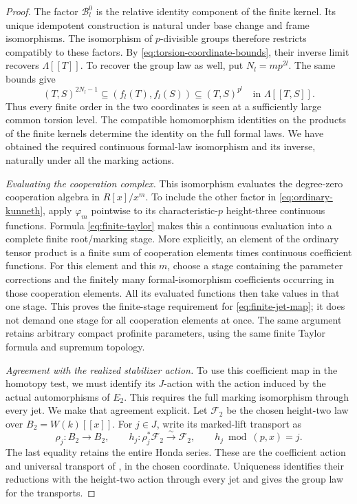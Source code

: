 \begin{proof}
The factor $\mathcal B_l^0$ is the relative identity component of
the finite kernel.  Its unique idempotent construction is natural
under base change and frame isomorphisms.  The isomorphism of
$p$-divisible groups therefore restricts compatibly to these
factors.  By \eqref{eq:torsion-coordinate-bounds}, their inverse
limit recovers $\Lambda[[T]]$. To recover the group law as well, put
$N_l=mp^{2l}$. The same bounds give
\[
 (T,S)^{2N_l-1}
   \subseteq(f_l(T),f_l(S))
   \subseteq(T,S)^{p^l}
       \quad\text{in }\Lambda[[T,S]].
\]
Thus every finite order in the two coordinates is seen at a sufficiently
large common torsion level. The compatible homomorphism identities on
the products of the finite kernels determine the identity on the full
formal laws. We have obtained the required continuous formal-law
isomorphism and its inverse, naturally under all the marking actions.

\smallskip\noindent\emph{Evaluating the cooperation complex.}
This isomorphism evaluates the degree-zero cooperation algebra in
$R[x]/x^m$.  To include the other factor in
\eqref{eq:ordinary-kunneth}, apply $\varphi_m$ pointwise to its
characteristic-$p$ height-three continuous functions.  Formula
\eqref{eq:finite-taylor} makes this a continuous evaluation into a
complete finite root/marking stage.  More explicitly, an element of
the ordinary tensor product is a finite sum of cooperation elements
times continuous coefficient functions.  For this element and this
$m$, choose a stage containing the parameter corrections and the
finitely many formal-isomorphism coefficients occurring in those
cooperation elements.  All its evaluated functions then take values
in that one stage.  This proves the finite-stage requirement for
\eqref{eq:finite-jet-map}; it does not demand one stage for all
cooperation elements at once.  The same argument retains arbitrary
compact profinite parameters, using the same finite Taylor formula
and supremum topology.

\smallskip\noindent\emph{Agreement with the realized stabilizer action.}
To use this coefficient map in the homotopy test, we must identify its
\(J\)-action with the action induced by the actual automorphisms of
\(E_2\). This requires the full marking isomorphism through every jet.
We make that agreement explicit. Let
\(\mathcal F_2\) be the chosen height-two law over
\(B_2=W(k)[[x]]\). For \(j\in J\), write its marked-lift transport as
\[
 \rho_j:B_2\longrightarrow B_2,\qquad
 h_j:\rho_j^*\mathcal F_2\xrightarrow{\sim}\mathcal F_2,\qquad
 h_j\bmod(p,x)=j.
\]
The last equality retains the entire Honda series. These are the
coefficient action and universal transport of
\citet[Section~1, Equation~(1.4), pp.~673--674]{DH95}, in the chosen
coordinate. Uniqueness identifies their reductions with the height-two
action through every jet and gives the group law for the transports.


\end{proof}
